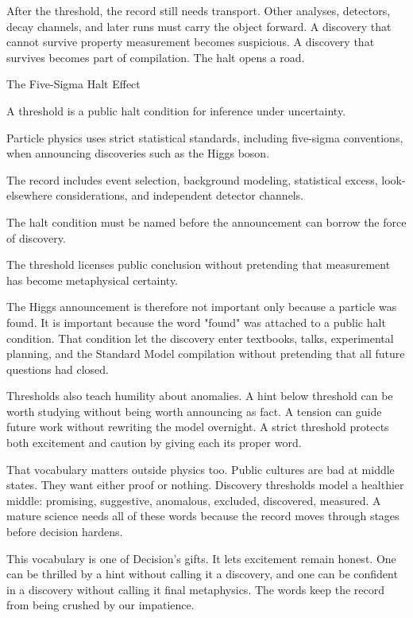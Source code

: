 After the threshold, the record still needs transport. Other analyses,
detectors, decay channels, and later runs must carry the object forward. A
discovery that cannot survive property measurement becomes suspicious. A
discovery that survives becomes part of compilation. The halt opens a road.

\begin{phenom}{The Five-Sigma Halt Effect~\cite{atlas2012,cms2012}}
\label{ph:five-sigma-halt}

\PhStatement
A threshold is a public halt condition for inference under uncertainty.

\PhOrigin
Particle physics uses strict statistical standards, including five-sigma
conventions, when announcing discoveries such as the Higgs boson.

\PhObservation
The record includes event selection, background modeling, statistical excess,
look-elsewhere considerations, and independent detector channels.

\PhConstraint
The halt condition must be named before the announcement can borrow the force
of discovery.

\PhConsequence
The threshold licenses public conclusion without pretending that measurement
has become metaphysical certainty.
\end{phenom}

The Higgs announcement is therefore not important only because a particle was
found. It is important because the word "found" was attached to a public halt
condition. That condition let the discovery enter textbooks, talks,
experimental planning, and the Standard Model compilation without pretending
that all future questions had closed.

Thresholds also teach humility about anomalies. A hint below threshold can be
worth studying without being worth announcing as fact. A tension can guide
future work without rewriting the model overnight. A strict threshold protects
both excitement and caution by giving each its proper word.

That vocabulary matters outside physics too. Public cultures are bad at
middle states. They want either proof or nothing. Discovery thresholds model a
healthier middle: promising, suggestive, anomalous, excluded, discovered,
measured. A mature science needs all of these words because the record moves
through stages before decision hardens.

This vocabulary is one of Decision's gifts. It lets excitement remain
honest. One can be thrilled by a hint without calling it a discovery, and one
can be confident in a discovery without calling it final metaphysics. The
words keep the record from being crushed by our impatience.


